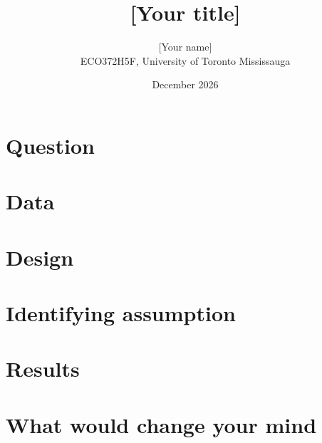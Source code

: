 \documentclass[11pt]{article}
\title{[Your title]}
\author{[Your name] \\ ECO372H5F, University of Toronto Mississauga}
\date{December 2026}
\begin{document}
\maketitle

\section{Question}

\section{Data}

\section{Design}

\section{Identifying assumption}

\section{Results}


\section{What would change your mind}
\end{document}
